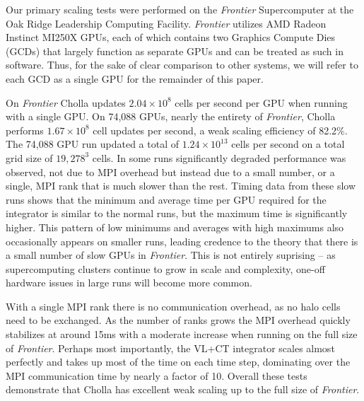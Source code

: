 Our primary scaling tests were performed on the \textit{Frontier} Supercomputer at the Oak Ridge Leadership Computing Facility. \textit{Frontier} utilizes AMD Radeon Instinct MI250X GPUs, each of which contains two Graphics Compute Dies (GCDs) that largely function as separate GPUs and can be treated as such in software. Thus, for the sake of clear comparison to other systems, we will refer to each GCD as a single GPU for the remainder of this paper. 

On \textit{Frontier} Cholla updates $2.04\times10^8$ cells per second per GPU when running with a single GPU. On 74,088 GPUs, nearly the entirety of \textit{Frontier}, Cholla performs $1.67\times10^8$ cell updates per second, a weak scaling efficiency of 82.2\%. The 74,088 GPU run updated a total of $1.24\times10^{13}$ cells per second on a total grid size of $19,278^3$ cells. In some runs significantly degraded performance was observed, not due to MPI overhead but instead due to a small number, or a single, MPI rank that is much slower than the rest. Timing data from these slow runs shows that the minimum and average time per GPU required for the integrator is similar to the normal runs, but the maximum time is significantly higher. This pattern of low minimums and averages with high maximums also occasionally appears on smaller runs, leading credence to the theory that there is a small number of slow GPUs in \textit{Frontier}. This is not entirely suprising -- as supercomputing clusters continue to grow in scale and complexity, one-off hardware issues in large runs will become more common.

With a single MPI rank there is no communication overhead, as no halo cells need to be exchanged. As the number of ranks grows the MPI overhead quickly stabilizes at around 15ms with a moderate increase when running on the full size of \textit{Frontier}. Perhaps most importantly, the VL+CT integrator scales almost perfectly and takes up most of the time on each time step, dominating over the MPI communication time by nearly a factor of 10. Overall these tests demonstrate that Cholla has excellent weak scaling up to the full size of \textit{Frontier}.


